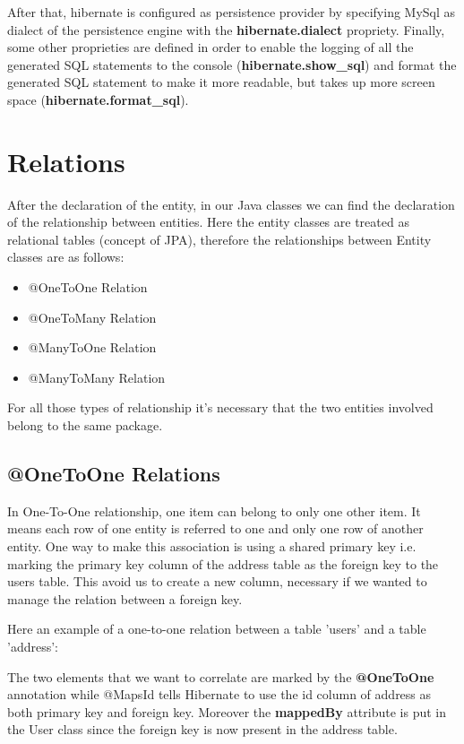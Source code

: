 \documentclass[a4paper]{article}
\begin{document}
After that, hibernate is configured as persistence provider by specifying MySql as dialect of the persistence engine with the \textbf{hibernate.dialect} propriety. Finally, some other proprieties are defined in order to enable the logging of all the generated SQL statements to the console (\textbf{hibernate.show\_sql}) and format the generated SQL statement to make it more readable, but takes up more screen space (\textbf{hibernate.format\_sql}).

\section{Relations}
After the declaration of the entity, in our Java classes we can find the declaration of the relationship between entities. Here the entity classes are treated as relational tables (concept of JPA), therefore the relationships between Entity classes are as follows:

\begin{itemize}
\item{@OneToOne Relation}
\item{@OneToMany Relation}
\item{@ManyToOne Relation}
\item{@ManyToMany Relation}
\end{itemize}
For all those types of relationship it's necessary that the two entities involved belong to the same package.

\subsection{@OneToOne Relations}
In One-To-One relationship, one item can belong to only one other item. It means each row of one entity is referred to one and only one row of another entity.
One way to make this association is using a shared primary key i.e. marking the primary key column of the address table as the foreign key to the users table. This avoid us to create a new column, necessary if we wanted to manage the relation between a foreign key.

Here an example of a one-to-one relation between a table 'users' and a table 'address':



The two elements that we want to correlate are marked by the \textbf{@OneToOne} annotation while @MapsId tells Hibernate to use the id column of address as both primary key and foreign key. Moreover the \textbf{mappedBy} attribute is put in the User class since the foreign key is now present in the address table.
\end{document}
